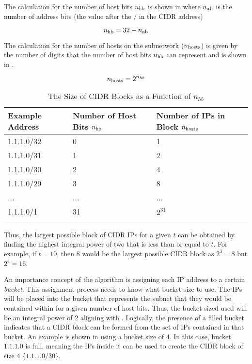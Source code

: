 The calculation for the number of host bits $n_\text{hb}$ is shown in  where $n_\text{ab}$ is the number of address bits (the value after the $/$ in the CIDR address)

\begin{equation}\label{eq:numHostBits}
n_\text{hb} = 32 - n_\text{ab} 
\end{equation} 

The calculation for the number of hosts on the subnetwork ($n_\text{hosts}$) is given by the number of digits that the number of host bits $n_\text{hb}$ can represent and is shown in .

\begin{equation}\label{eq:numHosts}
n_\text{hosts} = 2 ^ {n_{hb}}
\end{equation}

\begin{table}[H]
\centering
\begin{tabular}{l l l}
\toprule
\textbf{Example Address} & \textbf{Number of Host Bits $n_\text{hb}$} &\textbf{Number of IPs in Block $n_\text{hosts}$} \\
\midrule
1.1.1.0/32 & 0 & 1\\
1.1.1.0/31 & 1 & 2\\
1.1.1.0/30 & 2 & 4\\
1.1.1.0/29 & 3 & 8\\
... & ... & ...\\
1.1.1.0/1 & 31 & $2 ^ {31}$\\
\bottomrule\\
\end{tabular}
\caption{The Size of CIDR Blocks as a Function of $n_{hb}$}
\label{tbl:cidrBlockSize}
\end{table}

Thus, the largest possible block of CIDR IPs for a given $t$ can be obtained by finding the highest integral power of two that is less than or equal to $t$. For example, if $t = 10$, then 8 would be the largest possible CIDR block as $2^3 = 8$ but $2^4 = 16$.

An importance concept of the algorithm is assigning each IP address to a certain \textit{bucket}. This assignment process needs to know what bucket size to use. The IPs will be placed into the bucket that represents the subnet that they would be contained within for a given number of host bits. Thus, the bucket sized used will be an integral power of 2 aligning with . Logically, the presence of a filled bucket indicates that a CIDR block can be formed from the set of IPs contained in that bucket. An example is shown in  using a bucket size of 4. In this case, bucket $1.1.1.0$ is full, meaning the IPs inside it can be used to create the CIDR block of size 4 $\{1.1.1.0/30\}$.

